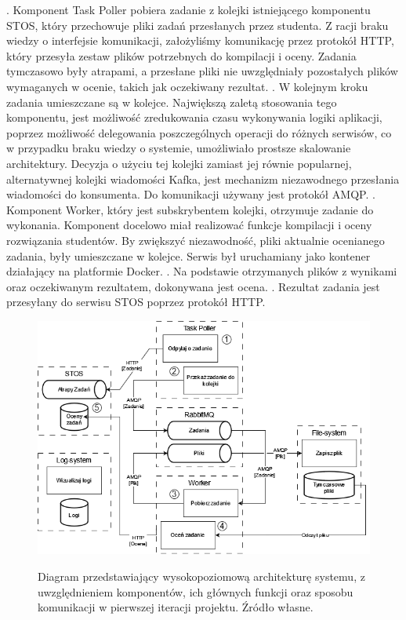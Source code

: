 \newline {}. Komponent Task Poller pobiera zadanie z kolejki istniejącego komponentu STOS, który przechowuje pliki zadań przesłanych przez studenta. Z racji braku wiedzy o interfejsie komunikacji, założyliśmy komunikację przez protokół HTTP, który przesyła zestaw plików potrzebnych do kompilacji i oceny. Zadania tymczasowo były atrapami, a przesłane pliki nie uwzględniały pozostałych plików wymaganych w ocenie, takich jak oczekiwany rezultat.
\newline {}. W kolejnym kroku zadania umieszczane są w kolejce. Największą zaletą stosowania tego komponentu, jest możliwość zredukowania czasu wykonywania logiki aplikacji, poprzez możliwość delegowania poszczególnych operacji do różnych serwisów, co w przypadku braku wiedzy o systemie, umożliwiało prostsze skalowanie architektury. Decyzja o użyciu tej kolejki zamiast jej równie popularnej, alternatywnej kolejki wiadomości Kafka, jest mechanizm niezawodnego przesłania wiadomości do konsumenta. Do komunikacji używany jest protokół AMQP.
\newline {}. Komponent Worker, który jest subskrybentem kolejki, otrzymuje zadanie do wykonania. Komponent docelowo miał realizować funkcje kompilacji i oceny rozwiązania studentów. By zwiększyć niezawodność, pliki aktualnie ocenianego zadania, były umieszczane w kolejce. Serwis był uruchamiany jako kontener działający na platformie Docker.
\newline {}. Na podstawie otrzymanych plików z wynikami oraz oczekiwanym rezultatem, dokonywana jest ocena.
\newline {}. Rezultat zadania jest przesyłany do serwisu STOS poprzez protokół HTTP.
\begin{figure}[!h]
	\begin{center}
		\resizebox{1.0\textwidth}{!} {
			\includegraphics{img/1/i1_arch.png}
		}
		\caption[Architektura po pierwszej iteracji]{Diagram przedstawiający wysokopoziomową architekturę systemu, z uwzględnieniem komponentów, ich głównych funkcji oraz sposobu komunikacji w pierwszej iteracji projektu. Źródło własne.}
	\end{center}
\end{figure}
